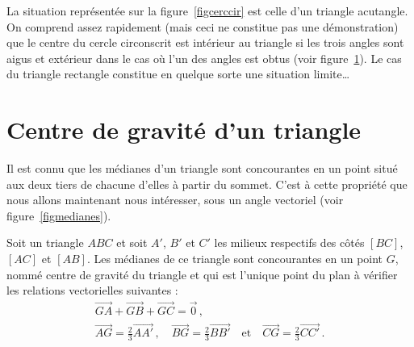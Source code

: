 \begin{remark} La situation représentée sur la figure \ref{figcerccir} est celle d'un triangle acutangle. On comprend assez rapidement (mais ceci ne constitue pas une démonstration) que le centre du cercle circonscrit est intérieur au triangle si les trois angles sont aigus et extérieur dans le cas où l'un des angles est obtus (voir figure \ref{figtrobtu}). Le cas du triangle rectangle constitue en quelque sorte une situation limite…
\end{remark}


\begin{figure}[ht]
\centering
{}
\figcaption{}\label{figtrobtu}
\end{figure}



\section{Centre de gravité d'un triangle}
Il est connu que les médianes d'un triangle sont concourantes en un point situé aux deux tiers de chacune d'elles à partir du sommet. C'est à cette propriété que nous allons maintenant nous intéresser, sous un angle vectoriel (voir figure \ref{figmedianes}).


\begin{thm}\label{thgravit}%
Soit un triangle $ABC$ et soit $A'$, $B'$ et $C'$ les milieux respectifs des côtés $[BC]$, $[AC]$ et $[AB]$.
Les médianes de ce triangle sont concourantes en un point $G$, nommé centre de gravité du triangle et qui est l'unique point du plan à vérifier les relations vectorielles suivantes :
\begin{gather}
\overrightarrow{GA}+\overrightarrow{GB}+\overrightarrow{GC}=\vec{0}\,,\label{eqisobar}\\
\overrightarrow{AG}=\frac23\overrightarrow{AA'}\,,\quad\overrightarrow{BG}=\frac23\overrightarrow{BB'}\quad\text{et}\quad\overrightarrow{CG}=\frac23\overrightarrow{CC'}\,.\label{eqGmediane}
\end{gather}%
\end{thm}

